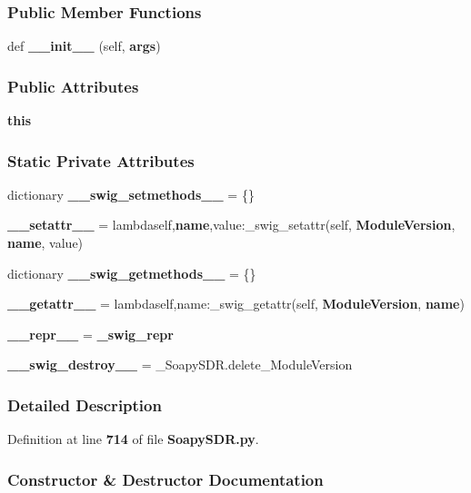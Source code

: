 \subsubsection*{Public Member Functions}
\begin{DoxyCompactItemize}
\item 
def {\bf \+\_\+\+\_\+init\+\_\+\+\_\+} (self, {\bf args})
\end{DoxyCompactItemize}
\subsubsection*{Public Attributes}
\begin{DoxyCompactItemize}
\item 
{\bf this}
\end{DoxyCompactItemize}
\subsubsection*{Static Private Attributes}
\begin{DoxyCompactItemize}
\item 
dictionary {\bf \+\_\+\+\_\+swig\+\_\+setmethods\+\_\+\+\_\+} = \{\}
\item 
{\bf \+\_\+\+\_\+setattr\+\_\+\+\_\+} = lambdaself,{\bf name},value\+:\+\_\+swig\+\_\+setattr(self, {\bf Module\+Version}, {\bf name}, value)
\item 
dictionary {\bf \+\_\+\+\_\+swig\+\_\+getmethods\+\_\+\+\_\+} = \{\}
\item 
{\bf \+\_\+\+\_\+getattr\+\_\+\+\_\+} = lambdaself,name\+:\+\_\+swig\+\_\+getattr(self, {\bf Module\+Version}, {\bf name})
\item 
{\bf \+\_\+\+\_\+repr\+\_\+\+\_\+} = {\bf \+\_\+swig\+\_\+repr}
\item 
{\bf \+\_\+\+\_\+swig\+\_\+destroy\+\_\+\+\_\+} = \+\_\+\+Soapy\+S\+D\+R.\+delete\+\_\+\+Module\+Version
\end{DoxyCompactItemize}


\subsubsection{Detailed Description}


Definition at line {\bf 714} of file {\bf Soapy\+S\+D\+R.\+py}.



\subsubsection{Constructor \& Destructor Documentation}
